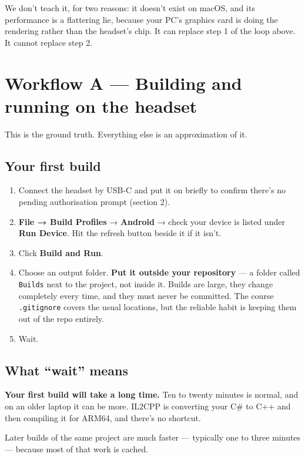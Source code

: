 \documentclass[11pt,a4paper]{article}
\providecommand{\tightlist}{\setlength{\itemsep}{2pt}\setlength{\parskip}{0pt}}
\begin{document}
We don't teach it, for two reasons: it doesn't exist on macOS, and its performance is a
flattering lie, because your PC's graphics card is doing the rendering rather than the
headset's chip. It can replace step 1 of the loop above. It cannot replace step 2.


\section{Workflow A --- Building and running on the headset}\label{workflow-a-building-and-running-on-the-headset}

This is the ground truth. Everything else is an approximation of it.

\subsection{Your first build}\label{your-first-build}

\begin{enumerate}
\def\labelenumi{\arabic{enumi}.}
\tightlist
\item
  Connect the headset by USB-C and put it on briefly to confirm there's no pending
  authorisation prompt (section 2).
\item
  \textbf{File → Build Profiles} → \textbf{Android} → check your device is listed under
  \textbf{Run Device}. Hit the refresh button beside it if it isn't.
\item
  Click \textbf{Build and Run}.
\item
  Choose an output folder. \textbf{Put it outside your repository} --- a folder called \texttt{Builds}
  next to the project, not inside it. Builds are large, they change completely every
  time, and they must never be committed. The course \texttt{.gitignore} covers the usual
  locations, but the reliable habit is keeping them out of the repo entirely.
\item
  Wait.
\end{enumerate}

\subsection{What ``wait'' means}\label{what-wait-means}

\textbf{Your first build will take a long time.} Ten to twenty minutes is normal, and on an
older laptop it can be more. IL2CPP is converting your C\# to C++ and then compiling it for
ARM64, and there's no shortcut.

Later builds of the same project are much faster --- typically one to three minutes ---
because most of that work is cached.
\end{document}
